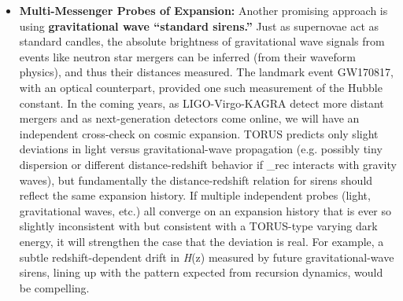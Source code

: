 \documentclass[
]{article}
\begin{document}
{\begin{itemize}
  by Planck CMB results under \LambdaCDM. TORUS provides a framework where
  recursion-induced modifications could \textbf{suppress the growth of
  structure on certain scales}, offering a possible explanation for this
  discrepancy\hspace{0pt}. Future surveys will clarify this: LSST and
  Euclid will measure the growth rate and clustering amplitude to
  unprecedented accuracy, tracking structure formation from early times
  to now. If they confirm a persistent deviation -- for example, a
  scale-dependent growth rate or an
  S_{8}{} value that
  remains significantly lower than \LambdaCDM predicts -- it could be a
  \textbf{signature of TORUS's extra gravity terms} influencing
  structure formation\hspace{0pt}. Conversely, if structure growth and
  clustering amplitude perfectly match the \LambdaCDM predictions when
  observational uncertainties shrink, it would constrain or rule out the
  need for any recursion-based modification in the dark energy or
  gravity sector.
\item
  \textbf{Multi-Messenger Probes of Expansion:} Another promising
  approach is using \textbf{gravitational wave ``standard sirens.''}
  Just as supernovae act as standard candles, the absolute brightness of
  gravitational wave signals from events like neutron star mergers can
  be inferred (from their waveform physics), and thus their distances
  measured. The landmark event GW170817, with an optical counterpart,
  provided one such measurement of the Hubble constant. In the coming
  years, as LIGO-Virgo-KAGRA detect more distant mergers and as
  next-generation detectors come online, we will have an independent
  cross-check on cosmic expansion. TORUS predicts only slight deviations
  in light versus gravitational-wave propagation (e.g. possibly tiny
  dispersion or different distance-redshift behavior if
  \emph{\Lambda}_{rec}{}
  interacts with gravity waves\hspace{0pt}), but fundamentally the
  distance-redshift relation for sirens should reflect the same
  expansion history. If multiple independent probes (light,
  gravitational waves, etc.) all converge on an expansion history that
  is ever so slightly inconsistent with \LambdaCDM but consistent with a
  TORUS-type varying dark energy, it will strengthen the case that the
  deviation is real. For example, a subtle redshift-dependent drift in
  \emph{H}(z) measured by future gravitational-wave sirens, lining up
  with the pattern expected from recursion dynamics, would be
  compelling.
\end{itemize}

}
\end{document}
